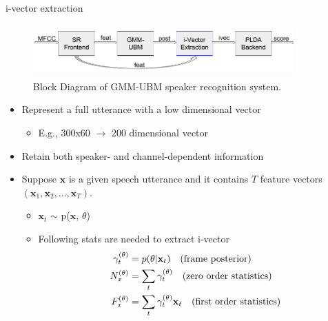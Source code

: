\documentclass{beamer}
\begin{document}
\begin{frame}{i-vector extraction}
\begin{figure}
      \centering
      \includegraphics[width=10cm, height=2cm]{figures/ivec_blockdiagram.png}
      \vspace{-4pt}
      \caption{Block Diagram of GMM-UBM speaker recognition system.}
      \label{fig:gmm_ivec}
  \end{figure}
  \vspace{-15pt}
  \begin{itemize}
  \item {
    Represent a full utterance with a low dimensional vector
    \begin{itemize}
        \item E.g., 300x60 $\rightarrow$ 200 dimensional vector
    \end{itemize}
  }
  \item Retain both speaker- and channel-dependent information
  \item Suppose $\mathbf{x}$ is a given speech utterance and it contains $T$ feature vectors $(\mathbf{x}_1, \mathbf{x}_2,...,\mathbf{x}_T)$.
    \begin{itemize}
        \item $\mathbf{x}_t$ $\sim$ p($\mathbf{x}$, $\theta$)
        \item Following stats are needed to extract i-vector
        \begin{equation} \label{eq1}
         \begin{split}
           \gamma_{t}^{(\theta)} &= p(\theta|{\bf x}_t)             \quad \text{(frame posterior)} \\
            N_x^{(\theta)} &= \sum_t \gamma_{t}^{(\theta)}              \quad \text{(zero order statistics)} \\
            F_x^{(\theta)} &= \sum_t \gamma_{t}^{(\theta)} {\bf x}_t \quad \text{(first order statistics)}
	\end{split}
	\end{equation}
    \end{itemize}
  \end{itemize}
\end{frame}
\end{document}
